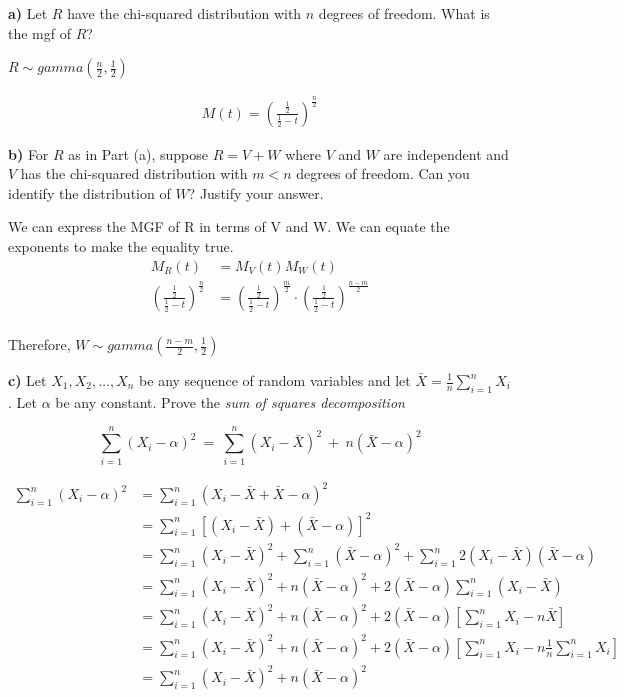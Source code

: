 \documentclass[11pt]{article}
\begin{document}
\textbf{a)} Let \(R\) have the chi-squared distribution with \(n\)
degrees of freedom. What is the mgf of \(R\)?


$R \sim gamma(\frac{n}{2}, \frac{1}{2})$ 


\begin{align*}
	M(t) = \left( \frac{\frac{1}{2}}{\frac{1}{2} - t} \right) ^{\frac{n}{2}} 
\end{align*}


\textbf{b)} For \(R\) as in Part (a), suppose \(R = V + W\) where \(V\)
and \(W\) are independent and \(V\) has the chi-squared distribution
with \(m < n\) degrees of freedom. Can you identify the distribution of
\(W\)? Justify your answer.

We can express the MGF of R in terms of V and W. We can equate the exponents to make the equality true. 
\begin{align*}
	M_{R}(t) &=  M_{V}(t) M_{W}(t) \\
	\left( \frac{\frac{1}{2}}{\frac{1}{2}-t} \right) ^{\frac{n}{2}} &=  \left( \frac{\frac{1}{2}}{\frac{1}{2}-t} \right) ^{\frac{m}{2}} \cdot  \left( \frac{\frac{1}{2}}{\frac{1}{2}-t} \right) ^{\frac{n-m}{2}}  \\
\end{align*} 


Therefore, $W \sim gamma(\frac{n-m}{2}, \frac{1}{2})$


\textbf{c)} Let \(X_1, X_2, \ldots , X_n\) be any sequence of random
variables and let \(\bar{X} = \frac{1}{n}\sum_{i=1}^n X_i\). Let
\(\alpha\) be any constant. Prove the \emph{sum of squares
decomposition}

\[
\sum_{i=1}^n (X_i - \alpha)^2 ~=~ \sum_{i=1}^n (X_i - \bar{X})^2 ~+~ n(\bar{X} - \alpha)^2
\]


\begin{align*}
\sum_{i=1}^{n} (X_{i} - \alpha)^{2} &= \sum_{i=1}^{n} (X_{i} - \bar X + \bar X - \alpha)^{2} \\
				    &= \sum_{i=1}^{n} \left[ (X_{i} - \bar X) + (\bar X - \alpha) \right]^{2} \\
				    &= \sum_{i=1}^{n} (X_{i} - \bar X)^{2} + \sum_{i=1}^{n} (\bar X - \alpha)^{2} + \sum_{i=1}^{n} 2(X_{i} - \bar X)(\bar X - \alpha) \\
		    &= \sum_{i=1}^{n} (X_{i} - \bar X)^{2} + n (\bar X - \alpha)^{2} + 2(\bar X - \alpha) \sum_{i=1}^{n} (X_{i}- \bar X) \\
		    &= \sum_{i=1}^{n}(X_{i} - \bar X)^{2} + n(\bar X - \alpha)^{2} + 2(\bar X - \alpha) \left[ \sum_{i=1}^{n} X_{i} - n \bar X \right]\\
		    &= \sum_{i=1}^{n}(X_{i} - \bar X)^{2} + n(\bar X - \alpha)^{2}+ 2(\bar X - \alpha) \left[ \sum_{i=1}^{n}X_{i} - n \frac{1}{n}\sum_{i=1}^{n} X_{i}\right]  \\
		    &= \sum_{i=1}^{n}(X_{i} - \bar X)^{2} + n(\bar X - \alpha)^{2}   \\
\end{align*}
\end{document}
